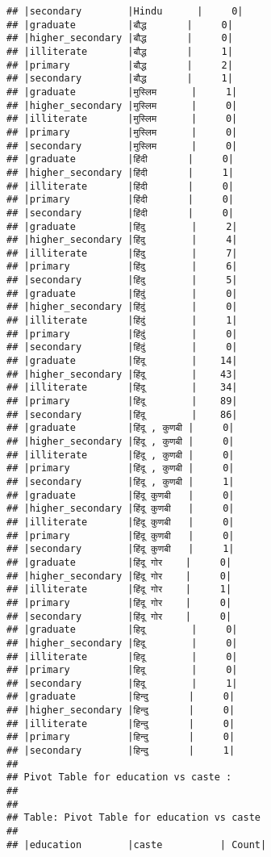 \documentclass[
]{article}
\begin{document}
\begin{verbatim}
## |secondary        |Hindu      |     0|
## |graduate         |बौद्ध       |     0|
## |higher_secondary |बौद्ध       |     0|
## |illiterate       |बौद्ध       |     1|
## |primary          |बौद्ध       |     2|
## |secondary        |बौद्ध       |     1|
## |graduate         |मुस्लिम      |     1|
## |higher_secondary |मुस्लिम      |     0|
## |illiterate       |मुस्लिम      |     0|
## |primary          |मुस्लिम      |     0|
## |secondary        |मुस्लिम      |     0|
## |graduate         |हिंदी       |     0|
## |higher_secondary |हिंदी       |     1|
## |illiterate       |हिंदी       |     0|
## |primary          |हिंदी       |     0|
## |secondary        |हिंदी       |     0|
## |graduate         |हिंदु        |     2|
## |higher_secondary |हिंदु        |     4|
## |illiterate       |हिंदु        |     7|
## |primary          |हिंदु        |     6|
## |secondary        |हिंदु        |     5|
## |graduate         |हिंदुं        |     0|
## |higher_secondary |हिंदुं        |     0|
## |illiterate       |हिंदुं        |     1|
## |primary          |हिंदुं        |     0|
## |secondary        |हिंदुं        |     0|
## |graduate         |हिंदू        |    14|
## |higher_secondary |हिंदू        |    43|
## |illiterate       |हिंदू        |    34|
## |primary          |हिंदू        |    89|
## |secondary        |हिंदू        |    86|
## |graduate         |हिंदू , कुणबी |     0|
## |higher_secondary |हिंदू , कुणबी |     0|
## |illiterate       |हिंदू , कुणबी |     0|
## |primary          |हिंदू , कुणबी |     0|
## |secondary        |हिंदू , कुणबी |     1|
## |graduate         |हिंदू कुणबी   |     0|
## |higher_secondary |हिंदू कुणबी   |     0|
## |illiterate       |हिंदू कुणबी   |     0|
## |primary          |हिंदू कुणबी   |     0|
## |secondary        |हिंदू कुणबी   |     1|
## |graduate         |हिंदू गोर    |     0|
## |higher_secondary |हिंदू गोर    |     0|
## |illiterate       |हिंदू गोर    |     1|
## |primary          |हिंदू गोर    |     0|
## |secondary        |हिंदू गोर    |     0|
## |graduate         |हिदू        |     0|
## |higher_secondary |हिदू        |     0|
## |illiterate       |हिदू        |     0|
## |primary          |हिदू        |     0|
## |secondary        |हिदू        |     1|
## |graduate         |हिन्दु       |     0|
## |higher_secondary |हिन्दु       |     0|
## |illiterate       |हिन्दु       |     0|
## |primary          |हिन्दु       |     0|
## |secondary        |हिन्दु       |     1|
## 
## Pivot Table for education vs caste :
## 
## 
## Table: Pivot Table for education vs caste
## 
## |education        |caste          | Count|

\end{verbatim}
\end{document}
